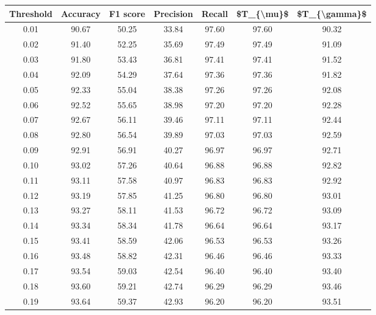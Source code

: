 \begin{tabular}{|c|c|c|c|c|c|c|}
\hline
 Threshold &  Accuracy &  F1 score &  Precision &  Recall &  \$T\_\{\textbackslash mu\}\$ &  \$T\_\{\textbackslash gamma\}\$ \\
\hline
      0.01 &     90.67 &     50.25 &      33.84 &   97.60 &      97.60 &         90.32 \\
      0.02 &     91.40 &     52.25 &      35.69 &   97.49 &      97.49 &         91.09 \\
      0.03 &     91.80 &     53.43 &      36.81 &   97.41 &      97.41 &         91.52 \\
      0.04 &     92.09 &     54.29 &      37.64 &   97.36 &      97.36 &         91.82 \\
      0.05 &     92.33 &     55.04 &      38.38 &   97.26 &      97.26 &         92.08 \\
      0.06 &     92.52 &     55.65 &      38.98 &   97.20 &      97.20 &         92.28 \\
      0.07 &     92.67 &     56.11 &      39.46 &   97.11 &      97.11 &         92.44 \\
      0.08 &     92.80 &     56.54 &      39.89 &   97.03 &      97.03 &         92.59 \\
      0.09 &     92.91 &     56.91 &      40.27 &   96.97 &      96.97 &         92.71 \\
      0.10 &     93.02 &     57.26 &      40.64 &   96.88 &      96.88 &         92.82 \\
      0.11 &     93.11 &     57.58 &      40.97 &   96.83 &      96.83 &         92.92 \\
      0.12 &     93.19 &     57.85 &      41.25 &   96.80 &      96.80 &         93.01 \\
      0.13 &     93.27 &     58.11 &      41.53 &   96.72 &      96.72 &         93.09 \\
      0.14 &     93.34 &     58.34 &      41.78 &   96.64 &      96.64 &         93.17 \\
      0.15 &     93.41 &     58.59 &      42.06 &   96.53 &      96.53 &         93.26 \\
      0.16 &     93.48 &     58.82 &      42.31 &   96.46 &      96.46 &         93.33 \\
      0.17 &     93.54 &     59.03 &      42.54 &   96.40 &      96.40 &         93.40 \\
      0.18 &     93.60 &     59.21 &      42.74 &   96.29 &      96.29 &         93.46 \\
      0.19 &     93.64 &     59.37 &      42.93 &   96.20 &      96.20 &         93.51 \\

\end{tabular}
